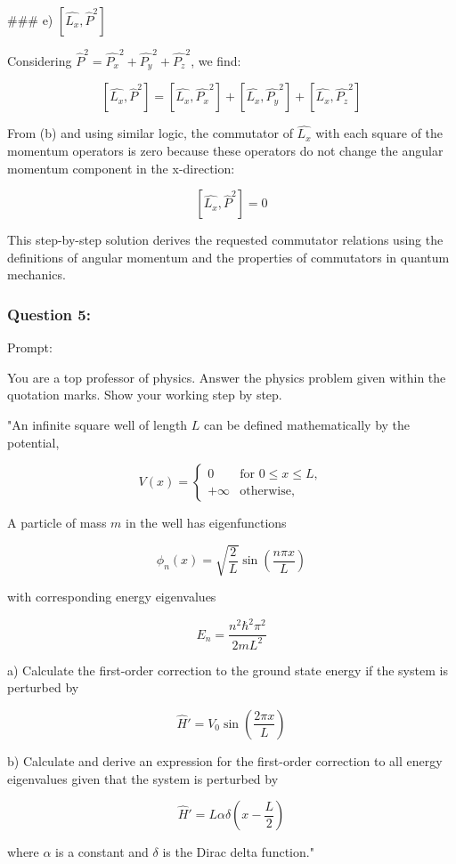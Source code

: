 \documentclass[a4paper,11pt]{article}
\begin{document}
### e) \( \left[ \hat{L_{x}}, \hat{P}^{2} \right] \)

Considering \( \hat{P}^{2} = \hat{P_{x}}^2 + \hat{P_{y}}^2 + \hat{P_{z}}^2 \), we find:

\[
\left[ \hat{L_{x}}, \hat{P}^{2} \right] = \left[ \hat{L_{x}}, \hat{P_{x}}^2 \right] + \left[ \hat{L_{x}}, \hat{P_{y}}^2 \right] + \left[ \hat{L_{x}}, \hat{P_{z}}^2 \right]
\]

From (b) and using similar logic, the commutator of \( \hat{L_{x}} \) with each square of the momentum operators is zero because these operators do not change the angular momentum component in the x-direction:

\[
\left[ \hat{L_{x}}, \hat{P}^{2} \right] = 0
\]

This step-by-step solution derives the requested commutator relations using the definitions of angular momentum and the properties of commutators in quantum mechanics. 

\subsubsection*{Question 5:}

Prompt:
\begin{spverbatim}
    You are a top professor of physics. Answer the physics problem given within the quotation marks. Show your working step by step.

    "An infinite square well of length \( L \) can be defined mathematically by the potential,

    \[ V(x) = \begin{cases}
    0 & \text{for } 0 \leq x \leq L,\\
    +\infty  & \text{otherwise,} 
    \end{cases} \]

    A particle of mass \( m \) in the well has eigenfunctions

    \[ \phi_{n}(x) = \sqrt{\frac{2}{L}} \sin\left(\frac{n \pi x}{L} \right) \]

    with corresponding energy eigenvalues 

    \[ E_{n} = \frac{n^{2}\hbar^{2}\pi^{2}}{2mL^{2}} \]

    a) Calculate the first-order correction to the ground state energy if the system is perturbed by 

    \[ \hat{H}' = V_{0} \sin\left(\frac{2 \pi x}{L} \right) \]

    b) Calculate and derive an expression for the first-order correction to all energy eigenvalues given that the system is perturbed by 

    \[ \hat{H}' = L\alpha \delta\left(x - \frac{L}{2} \right) \]

    where \( \alpha \) is a constant and \( \delta \) is the Dirac delta function."
\end{spverbatim}
\end{document}
